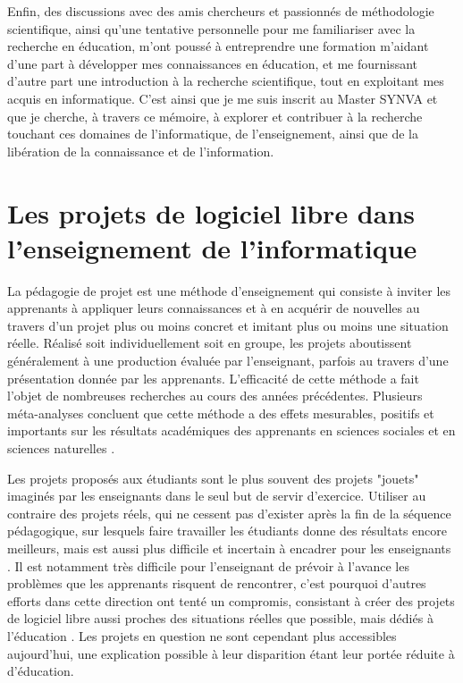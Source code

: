 Enfin, des discussions avec des amis chercheurs et passionnés de méthodologie scientifique, ainsi qu'une
tentative personnelle pour me familiariser avec la recherche en éducation, m'ont poussé à entreprendre une
formation m'aidant d'une part à développer mes connaissances en éducation, et me fournissant d'autre part une
introduction à la recherche scientifique, tout en exploitant mes acquis en informatique. C'est ainsi que je me
suis inscrit au Master SYNVA et que je cherche, à travers ce mémoire, à explorer et contribuer à la recherche
touchant ces domaines de l'informatique, de l'enseignement, ainsi que de la libération de la connaissance et
de l'information.

\section{Les projets de logiciel libre dans l'enseignement de l'informatique}

La pédagogie de projet est une méthode d'enseignement qui consiste à inviter les apprenants à appliquer leurs
connaissances et à en acquérir de nouvelles au travers d'un projet plus ou moins concret et imitant plus ou
moins une situation réelle. Réalisé soit individuellement soit en groupe, les projets aboutissent généralement
à une production évaluée par l'enseignant, parfois au travers d'une présentation donnée par les apprenants.
L'efficacité de cette méthode a fait l'objet de nombreuses recherches au cours des années précédentes.
Plusieurs méta-analyses concluent que cette méthode a des effets mesurables, positifs et importants sur les
résultats académiques des apprenants en sciences sociales et en sciences naturelles
.

Les projets proposés aux étudiants sont le plus souvent des projets "jouets" imaginés par les enseignants dans
le seul but de servir d'exercice. Utiliser au contraire des projets réels, qui ne cessent pas d'exister après
la fin de la séquence pédagogique, sur lesquels faire travailler les étudiants donne des résultats encore
meilleurs, mais est aussi plus difficile et incertain à encadrer pour les enseignants
. Il est notamment très difficile pour l'enseignant de prévoir à
l'avance les problèmes que les apprenants risquent de rencontrer, c'est pourquoi d'autres efforts dans cette
direction ont tenté un compromis, consistant à créer des projets de logiciel libre aussi proches des
situations réelles que possible, mais dédiés à l'éducation . Les projets en
question ne sont cependant plus accessibles aujourd'hui, une explication possible à leur disparition étant
leur portée réduite à d'éducation.

